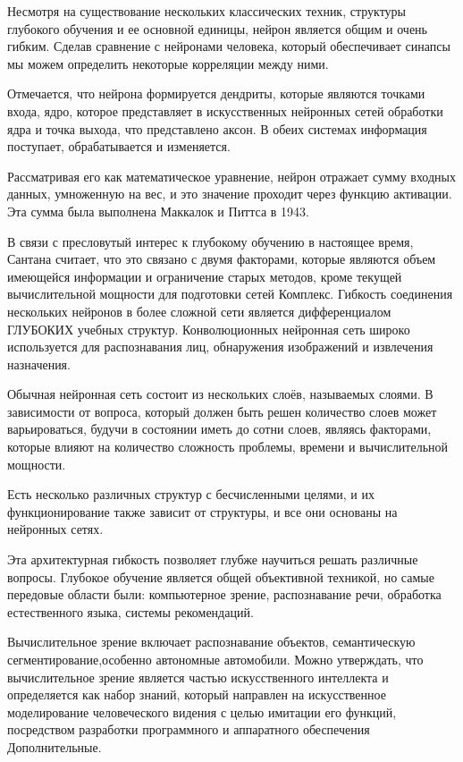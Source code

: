 Несмотря на существование нескольких классических техник, структуры глубокого обучения и ее основной единицы,
нейрон является общим и очень гибким. Сделав сравнение с нейронами человека,
который обеспечивает синапсы мы можем определить некоторые корреляции между ними.


Отмечается, что нейрона формируется дендриты, которые являются точками входа, ядро,
которое представляет в искусственных нейронных сетей обработки ядра и точка выхода, что представлено аксон.
В обеих системах информация поступает, обрабатывается и изменяется.

Рассматривая его как математическое уравнение, нейрон отражает сумму входных данных,
умноженную на вес, и это значение проходит через функцию активации.
Эта сумма была выполнена Маккалок и Питтса в 1943.

В связи с пресловутый интерес к глубокому обучению в настоящее время, Сантана считает,
что это связано с двумя факторами, которые являются объем имеющейся информации и ограничение старых методов,
кроме текущей вычислительной мощности для подготовки сетей Комплекс.
Гибкость соединения нескольких нейронов в более сложной сети является дифференциалом ГЛУБОКИХ учебных структур.
Конволюционных нейронная сеть широко используется для распознавания лиц, обнаружения изображений и извлечения назначения.

Обычная нейронная сеть состоит из нескольких слоёв, называемых слоями.
В зависимости от вопроса, который должен быть решен количество слоев может варьироваться,
будучи в состоянии иметь до сотни слоев, являясь факторами,
которые влияют на количество сложность проблемы,
времени и вычислительной мощности.

Есть несколько различных структур с бесчисленными целями,
и их функционирование также зависит от структуры,
и все они основаны на нейронных сетях.


Эта архитектурная гибкость позволяет глубже научиться решать различные вопросы.
Глубокое обучение является общей объективной техникой, но самые передовые области были:
компьютерное зрение, распознавание речи, обработка естественного языка, системы рекомендаций.

Вычислительное зрение включает распознавание объектов, семантическую сегментирование,особенно автономные автомобили.
Можно утверждать, что вычислительное зрение является частью искусственного интеллекта и определяется как набор знаний,
который направлен на искусственное моделирование человеческого видения с целью имитации его функций,
посредством разработки программного и аппаратного обеспечения Дополнительные.

